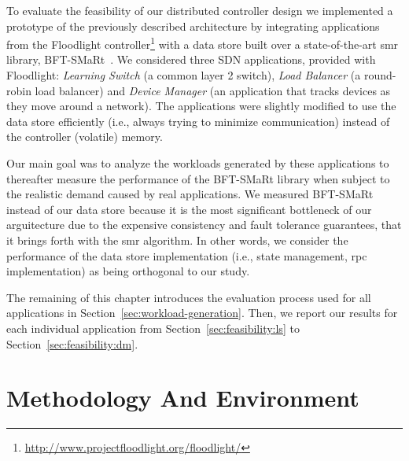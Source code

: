 \label{sec:feasibility:apps}
\glsresetall

To evaluate the feasibility of our distributed controller design we implemented a prototype of the previously described architecture by integrating applications from the Floodlight controller\footnote{\url{http://www.projectfloodlight.org/floodlight/}} with a data store built over a state-of-the-art \gls{smr} library, BFT-SMaRt~\cite{smart-tr}. 
We considered three SDN applications, provided with Floodlight: \emph{Learning Switch}  (a common layer 2 switch), \emph{Load   Balancer} (a round-robin load balancer) and \emph{Device Manager} (an application that tracks devices as they move around a network). 
The applications were slightly modified to use the data store efficiently (i.e., always trying to minimize communication) instead of the controller (volatile) memory.

Our main goal  was to analyze the workloads generated by these applications to thereafter measure the performance of the BFT-SMaRt library when subject to the realistic demand caused by real applications.
We measured BFT-SMaRt instead of our data store because it is the most significant bottleneck of our arguitecture due to the expensive consistency and fault tolerance guarantees, that it  brings forth with the \gls{smr} algorithm. 
In other words, we consider the performance of the data store implementation (i.e., state management, \gls{rpc} implementation) as being orthogonal to our study. 

The remaining of this chapter introduces the evaluation process used for all applications in Section~\ref{sec:workload-generation}. 
Then, we report our results for each individual application from  Section~\ref{sec:feasibility:ls} to Section~\ref{sec:feasibility:dm}. 



\section{Methodology And Environment}



